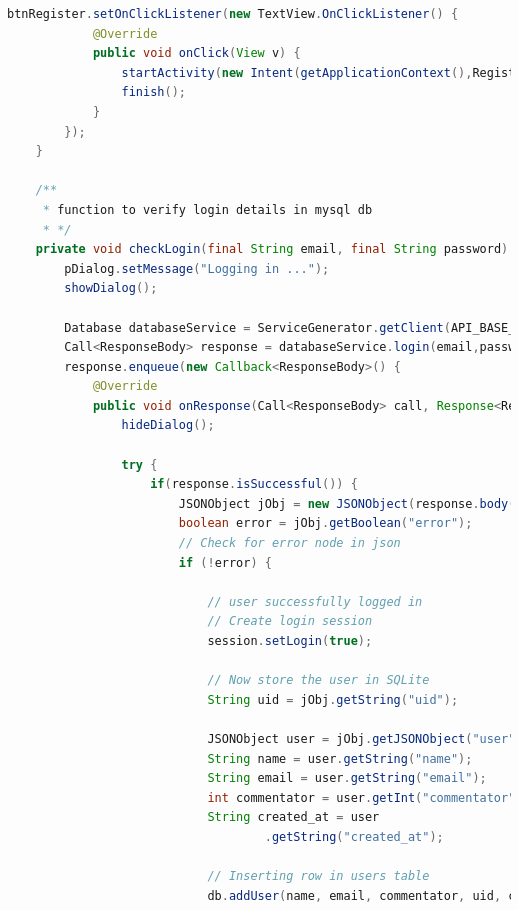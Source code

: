 \documentclass{article}
\begin{document}
\begin{landscape}
\begin{lstlisting}[language=Java,basicstyle=\tiny]
        btnRegister.setOnClickListener(new TextView.OnClickListener() {
            @Override
            public void onClick(View v) {
                startActivity(new Intent(getApplicationContext(),RegisterActivity.class));
                finish();
            }
        });
    }

    /**
     * function to verify login details in mysql db
     * */
    private void checkLogin(final String email, final String password) {
        pDialog.setMessage("Logging in ...");
        showDialog();

        Database databaseService = ServiceGenerator.getClient(API_BASE_URL).create(Database.class);
        Call<ResponseBody> response = databaseService.login(email,password);
        response.enqueue(new Callback<ResponseBody>() {
            @Override
            public void onResponse(Call<ResponseBody> call, Response<ResponseBody> response) {
                hideDialog();

                try {
                    if(response.isSuccessful()) {
                        JSONObject jObj = new JSONObject(response.body().string());
                        boolean error = jObj.getBoolean("error");
                        // Check for error node in json
                        if (!error) {

                            // user successfully logged in
                            // Create login session
                            session.setLogin(true);

                            // Now store the user in SQLite
                            String uid = jObj.getString("uid");

                            JSONObject user = jObj.getJSONObject("user");
                            String name = user.getString("name");
                            String email = user.getString("email");
                            int commentator = user.getInt("commentator");
                            String created_at = user
                                    .getString("created_at");

                            // Inserting row in users table
                            db.addUser(name, email, commentator, uid, created_at);


\end{lstlisting}
\end{landscape}
\end{document}
